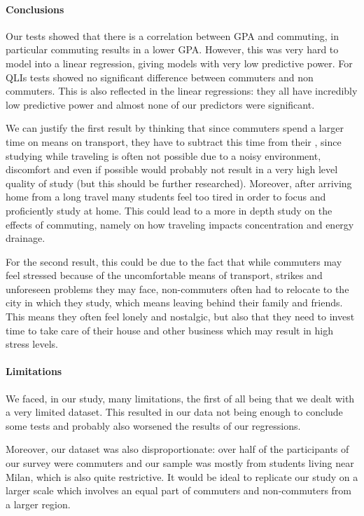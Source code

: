 \documentclass[11pt]{extarticle}
\numberwithin{table}{section}
\numberwithin{figure}{section}
\numberwithin{equation}{section}
\begin{document}
\paragraph{Conclusions}
Our tests showed that there is a correlation between GPA and commuting,
in particular commuting results in a lower GPA.
However, this was very hard to model into a linear regression, giving models with very low
predictive power.
For QLIs tests showed no significant difference between commuters and non commuters.
This is also reflected in the linear regressions: they all have incredibly low predictive power
and almost none of our predictors were significant.

We can justify the first result by thinking that since commuters spend a larger time on
means on transport, they have to subtract this time from their ,
since studying while traveling is often not possible due to a noisy environment,
discomfort and even if possible would probably not result in a very high level quality of study
(but this should be further researched).
Moreover, after arriving home from a long travel many students feel too tired in order to focus
and proficiently study at home.
This could lead to a more in depth study on the effects of commuting,
namely on how traveling impacts concentration and energy drainage.

For the second result, this could be due to the fact that while commuters may feel stressed
because of the uncomfortable means of transport, strikes and unforeseen problems they may face,
non-commuters often had to relocate to the city in which they study,
which means leaving behind their family and friends.
This means they often feel lonely and nostalgic, but also that they need to invest time
to take care of their house and other business which may result in high stress levels.

\paragraph{Limitations}
We faced, in our study, many limitations, the first of all being that we dealt with
a very limited dataset.
This resulted in our data not being enough to conclude some tests and
probably also worsened the results of our regressions.

Moreover, our dataset was also disproportionate: over half of the participants
of our survey were commuters and our sample was mostly from students living near Milan,
which is also quite restrictive.
It would be ideal to replicate our study on a larger scale which involves an equal part
of commuters and non-commuters from a larger region.
\end{document}
